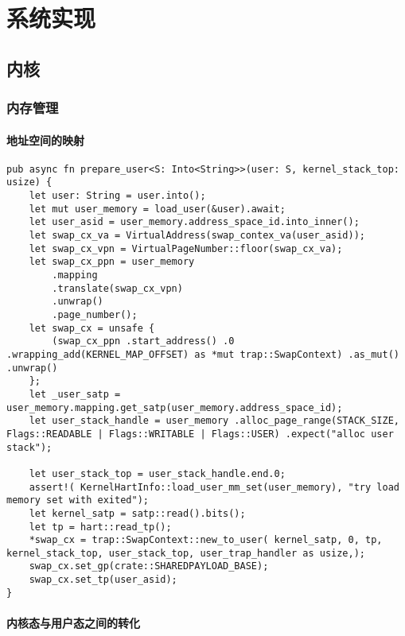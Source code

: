 \chapter{系统实现}
\label{chap:SystemImplement}

\section{内核}

\subsection{内存管理}
\subsubsection{地址空间的映射}

\begin{lstlisting}[caption=用户态对地址空间的映射]
pub async fn prepare_user<S: Into<String>>(user: S, kernel_stack_top: usize) {
    let user: String = user.into();
    let mut user_memory = load_user(&user).await;
    let user_asid = user_memory.address_space_id.into_inner();
    let swap_cx_va = VirtualAddress(swap_contex_va(user_asid));
    let swap_cx_vpn = VirtualPageNumber::floor(swap_cx_va);
    let swap_cx_ppn = user_memory
        .mapping
        .translate(swap_cx_vpn)
        .unwrap()
        .page_number();
    let swap_cx = unsafe {
        (swap_cx_ppn .start_address() .0 .wrapping_add(KERNEL_MAP_OFFSET) as *mut trap::SwapContext) .as_mut() .unwrap()
    };
    let _user_satp = user_memory.mapping.get_satp(user_memory.address_space_id);
    let user_stack_handle = user_memory .alloc_page_range(STACK_SIZE, Flags::READABLE | Flags::WRITABLE | Flags::USER) .expect("alloc user stack");

    let user_stack_top = user_stack_handle.end.0;
    assert!( KernelHartInfo::load_user_mm_set(user_memory), "try load memory set with exited");
    let kernel_satp = satp::read().bits();
    let tp = hart::read_tp();
    *swap_cx = trap::SwapContext::new_to_user( kernel_satp, 0, tp, kernel_stack_top, user_stack_top, user_trap_handler as usize,);
    swap_cx.set_gp(crate::SHAREDPAYLOAD_BASE);
    swap_cx.set_tp(user_asid);
}
\end{lstlisting}


\subsubsection{内核态与用户态之间的转化}

